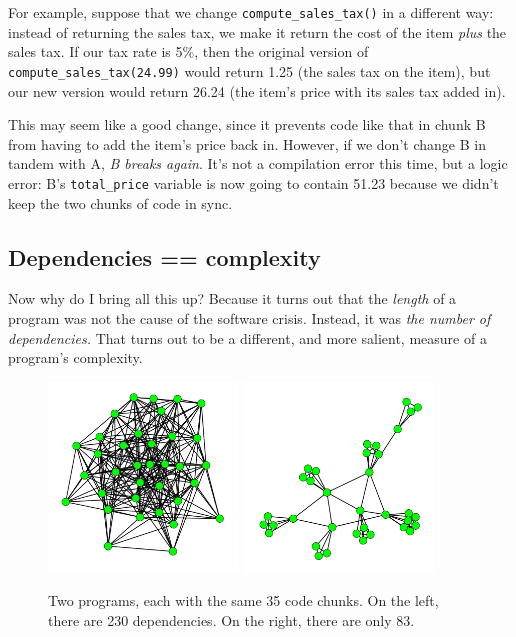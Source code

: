 For example, suppose that we change \texttt{compute\_sales\_tax()} in a
different way: instead of returning the sales tax, we make it return the cost
of the item \textit{plus} the sales tax. If our tax rate is 5\%, then the
original version of \texttt{compute\_sales\_tax(24.99)} would return 1.25 (the
sales tax on the item), but our new version would return 26.24 (the item's
price with its sales tax added in).

This may seem like a good change, since it prevents code like that in chunk B
from having to add the item's price back in. However, if we don't change B in
tandem with A, \textit{B breaks again}. It's not a compilation error this
time, but a logic error: B's \texttt{total\_price} variable is now going to
contain 51.23 because we didn't keep the two chunks of code in sync.

\subsection{Dependencies == complexity}

Now why do I bring all this up? Because it turns out that the \textit{length}
of a program was not the cause of the software crisis. Instead, it was
\textit{the number of dependencies.} That turns out to be a different, and
more salient, measure of a program's complexity.

\begin{figure}[ht]
\centering
\includegraphics[width=0.45\textwidth]{highDependencies.png}
\includegraphics[width=0.45\textwidth]{lowDependencies.png}
\caption{Two programs, each with the same 35 code chunks. On the left, there
are 230 dependencies. On the right, there are only 83.}
\label{fig:dependencies}
\end{figure}

